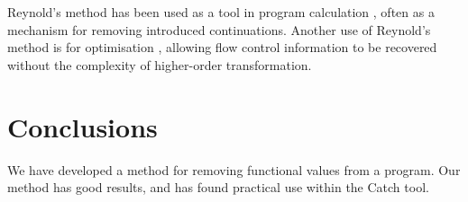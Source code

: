 \documentclass[preprint]{sigplanconf}
\begin{document}
Reynold's method has been used as a tool in program calculation \cite{graham_hutton_calculating_an_exceptional_machine, another_one, another_one}, often as a mechanism for removing introduced continuations. Another use of Reynold's method is for optimisation \cite{grin,jhc}, allowing flow control information to be recovered without the complexity of higher-order transformation.



\section{Conclusions}

We have developed a method for removing functional values from a program. Our method has good results, and has found practical use within the Catch tool.






\end{document}

